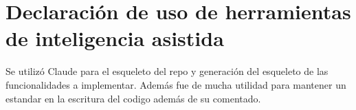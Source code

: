 \section*{Declaración de uso de herramientas de inteligencia asistida}
 Se utilizó Claude para el esqueleto del repo y generación del esqueleto de las funcionalidades a implementar. Además fue de mucha utilidad para mantener un estandar en la escritura del codigo además de su comentado.
